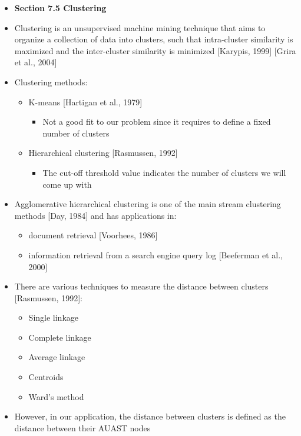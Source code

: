 \documentclass{article}
\newcommand{\bold}{\textbf}
\begin{document}
\begin{itemize} [leftmargin=.1in]
\item \bold{Section 7.5 Clustering}
\item Clustering is an unsupervised machine mining technique that aims to organize a collection of data into clusters, such that intra-cluster similarity is maximized and the inter-cluster similarity is minimized [Karypis, 1999] [Grira et al., 2004]
\item Clustering methods:
\begin{itemize}
\item K-means [Hartigan et al., 1979]
\begin{itemize}
\item Not a good fit to our problem since it requires to define a fixed number of clusters
\end{itemize}
\item Hierarchical clustering [Rasmussen, 1992]
\begin{itemize}
\item The cut-off threshold value indicates the number of clusters we will come up with
\end{itemize}
\end{itemize}
\item Agglomerative hierarchical clustering is one of the main stream clustering methods [Day, 1984] and has applications in:
\begin{itemize}
\item document retrieval [Voorhees, 1986]
\item information retrieval from a search engine query log [Beeferman et al., 2000]
\end{itemize}
\item There are various techniques to measure the distance between clusters [Rasmussen, 1992]:
\begin{itemize}
\item Single linkage
\item Complete linkage
\item Average linkage
\item Centroids
\item Ward's method
\end{itemize}
\item However, in our application, the distance between clusters is defined as the distance between their AUAST nodes


\end{itemize}
\end{document}
